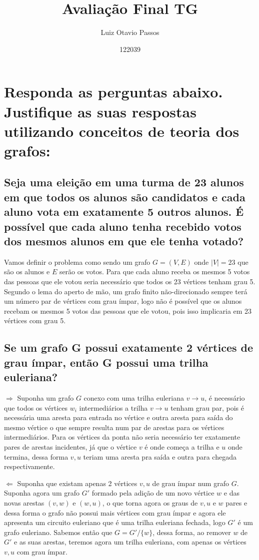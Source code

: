 \documentclass[12pt]{article}
\title{Avaliação Final TG}
\author{Luiz Otavio Passos}
\date{122039}
\begin{document}
\maketitle


\section{Responda as perguntas abaixo. Justifique as suas respostas utilizando conceitos de
teoria dos grafos:}
\subsection{Seja uma eleição em uma turma de 23 alunos em que todos os alunos são candidatos e
cada aluno vota em exatamente 5 outros alunos. É possível que cada aluno tenha
recebido votos dos mesmos alunos em que ele tenha votado?}

Vamos definir o problema como sendo um grafo $G=(V,E)$ onde $|V| = 23$ que são os alunos e $E$ serão os votos. Para que cada aluno receba os mesmos 5 votos das pessoas que ele votou seria necessário que todos os 23 vértices tenham grau 5.\\

Segundo o lema do aperto de mão, um grafo finito não-direcionado sempre terá um número par de vértices com grau ímpar, logo não é possível que os alunos recebam os mesmos 5 votos das pessoas que ele votou, pois isso implicaria em 23 vértices com grau 5.

\subsection{Se um grafo G possui exatamente 2 vértices de grau ímpar, então G possui uma trilha
euleriana?}

$\Rightarrow$ Suponha um grafo $G$ conexo com uma trilha euleriana $v \rightarrow u$, é necessário que todos os vértices $w_i$ intermediários a trilha $v \rightarrow u$ tenham grau par, pois é necessária uma aresta para entrada no vértice e outra aresta para saída do mesmo vértice o que sempre resulta num par de arestas para os vértices intermediários. Para os vértices da ponta não seria necessário ter exatamente  pares de arestas incidentes, já que o vértice $v$ é onde começa a trilha e $u$ onde termina, dessa forma $v,u$ teriam uma aresta pra saída e outra para chegada respectivamente.

$\Leftarrow$ Suponha que existam apenas 2 vértices $v,u$ de grau ímpar num grafo $G$. Suponha agora um grafo $G'$ formado pela adição de um novo vértice $w$ e das novas arestas $(v,w)$ e $(w,u)$, o que torna agora os graus de $v,u$ e $w$ pares e dessa forma o grafo não possui mais vértices com grau ímpar e agora ele apresenta um circuito euleriano que é uma trilha euleriana fechada, logo $G'$ é um grafo euleriano. Sabemos então que $G = G' / \{w\}$, dessa forma, ao remover $w$ de $G'$ e as suas arestas, teremos agora um trilha euleriana, com apenas os vértices $v,u$ com grau ímpar.
\end{document}
